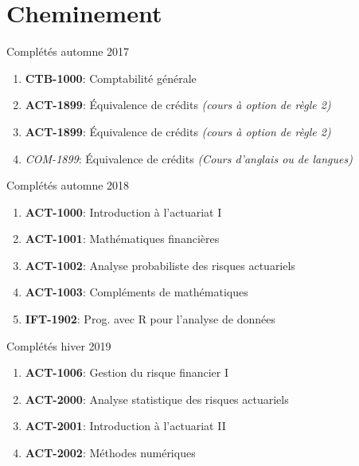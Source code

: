 \documentclass[10pt, french]{article}
\begin{document}
\section*{Cheminement}

\begin{multicols*}{2}

\begin{algo2}{Complétés automne 2017}
\begin{enumerate}
	\item[] \textbf{CTB-1000}: Comptabilité générale
	\item[] \textbf{ACT-1899}: Équivalence de crédits \textit{(cours à option de règle 2)}
	\item[] \textbf{ACT-1899}: Équivalence de crédits \textit{(cours à option de règle 2)}
	\item[] \textit{COM-1899}: Équivalence de crédits \textit{(Cours d’anglais ou de langues)}
\end{enumerate}
\end{algo2}


\begin{algo}{Complétés automne 2018}
\begin{enumerate}
	\item[] \textbf{ACT-1000}: Introduction à l’actuariat I
	\item[] \textbf{ACT-1001}: Mathématiques financières
	\item[] \textbf{ACT-1002}: Analyse probabiliste des risques actuariels
	\item[] \textbf{ACT-1003}: Compléments de mathématiques
	\item[] \textbf{IFT-1902}: Prog. avec R pour l'analyse de données
\end{enumerate}
\end{algo}



\begin{algo}{Complétés hiver 2019}
\begin{enumerate}
	\item[] \textbf{ACT-1006}: Gestion du risque financier I              
	\item[] \textbf{ACT-2000}: Analyse statistique des risques actuariels 
	\item[] \textbf{ACT-2001}: Introduction à l’actuariat II
	\item[] \textbf{ACT-2002}: Méthodes numériques                        
\end{enumerate}
\end{algo}




\end{multicols*}
\end{document}
